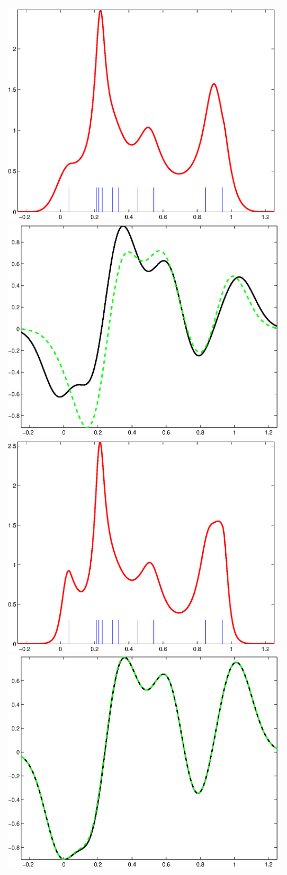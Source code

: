 \documentclass[noinfoline]{imsart}
\begin{document}
\begin{figure}[t]
\centering
\includegraphics[height = 2.2in]{pics/fig01/density_justn}
\includegraphics[height = 2.2in]{pics/fig01/agreement_justn}\\
\includegraphics[height = 2.2in]{pics/fig01/density_n_pm_h}
\includegraphics[height = 2.2in]{pics/fig01/agreement_n_pm_h}\\

\end{figure}
\end{document}
